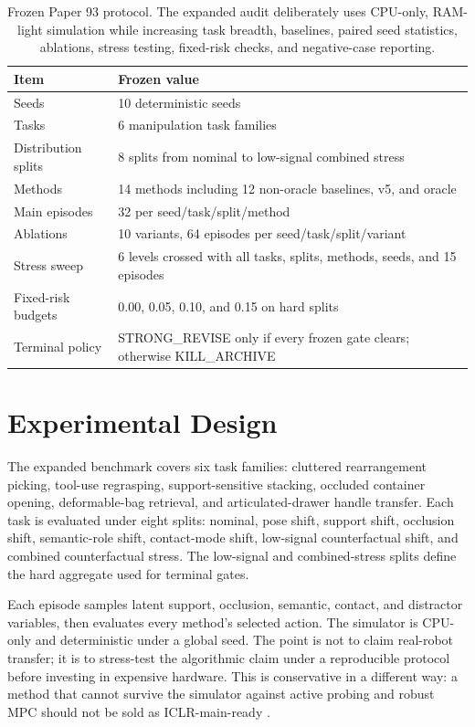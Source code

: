 \documentclass{article}
\begin{document}
\begin{table}[t]
\centering
\small
\begin{tabular}{ll}
\toprule
Item & Frozen value \\
\midrule
Seeds & 10 deterministic seeds \\
Tasks & 6 manipulation task families \\
Distribution splits & 8 splits from nominal to low-signal combined stress \\
Methods & 14 methods including 12 non-oracle baselines, v5, and oracle \\
Main episodes & 32 per seed/task/split/method \\
Ablations & 10 variants, 64 episodes per seed/task/split/variant \\
Stress sweep & 6 levels crossed with all tasks, splits, methods, seeds, and 15 episodes \\
Fixed-risk budgets & 0.00, 0.05, 0.10, and 0.15 on hard splits \\
Terminal policy & STRONG\_REVISE only if every frozen gate clears; otherwise KILL\_ARCHIVE \\
\bottomrule
\end{tabular}
\caption{Frozen Paper 93 protocol. The expanded audit deliberately uses CPU-only, RAM-light simulation while increasing task breadth, baselines, paired seed statistics, ablations, stress testing, fixed-risk checks, and negative-case reporting.}
\label{tab:protocol}
\end{table}


\section{Experimental Design}
The expanded benchmark covers six task families: cluttered rearrangement picking, tool-use regrasping, support-sensitive stacking, occluded container opening, deformable-bag retrieval, and articulated-drawer handle transfer. Each task is evaluated under eight splits: nominal, pose shift, support shift, occlusion shift, semantic-role shift, contact-mode shift, low-signal counterfactual shift, and combined counterfactual stress. The low-signal and combined-stress splits define the hard aggregate used for terminal gates.

Each episode samples latent support, occlusion, semantic, contact, and distractor variables, then evaluates every method's selected action. The simulator is CPU-only and deterministic under a global seed. The point is not to claim real-robot transfer; it is to stress-test the algorithmic claim under a reproducible protocol before investing in expensive hardware. This is conservative in a different way: a method that cannot survive the simulator against active probing and robust MPC should not be sold as ICLR-main-ready \citep{r101109iros20074399142,integratingtopologicalandmetrocmapsformobi,r1014801jkiit202422571,mapmergingformultirobotsystem,r102478s132300110012x,r101177105971239800600305,r101609aaaiv39i932969,r1011770278364909356602}.
\end{document}
